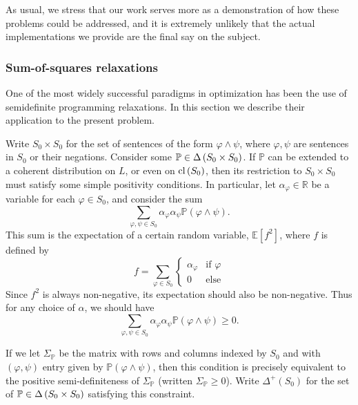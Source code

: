 \documentclass[12pt]{article}
\theoremstyle{definition}
\newcommand{\RR}{\mathbb{R}}
\newcommand{\of}[1]{\left(#1\right)}
\newcommand{\PP}{\mathbb{P}}
\renewcommand{\P}[1]{\mathbb{P}\of{#1}}
\newcommand{\E}[1]{\mathbb{E}\left[#1\right]}
\newcommand{\vp}{\varphi}
\begin{document}
As usual, we stress that our work serves more as a demonstration
of how these problems could be addressed,
and it is extremely unlikely that the actual implementations we provide
are the final say on the subject.

\subsubsection{Sum-of-squares relaxations}\label{sos}

One of the most widely successful paradigms in optimization
has been the use of semidefinite programming relaxations.
In this section we describe their application to the present problem.

Write $S_0 \times S_0$ for the set of sentences of the form $\vp \wedge \psi$,
where $\vp, \psi$ are sentences in $S_0$ or their negations.
Consider some $\PP \in \D{S_0 \times S_0}$.
If $\PP$ can be extended to a coherent distribution on $L$,
or even on $\clS$, then its restriction to $S_0 \times S_0$
must satisfy some simple positivity conditions.
In particular, let $\alpha_{\vp} \in \RR$ be a variable
for each $\vp \in S_0$,
and consider the sum
\[ \sum_{\vp, \psi \in S_0} \alpha_{\vp} \alpha_{\psi} \P{\vp \wedge \psi}. \]
This sum is the expectation of a certain random variable, $\E{f^2}$,
where $f$ is defined by
\[ f = \sum_{\vp \in S_0}  \begin{cases} 
    \alpha_{\vp} & \mbox{if } \vp \\
    0 & \mbox{else}
\end{cases} \]
Since $f^2$ is always non-negative, its expectation should also be non-negative. 
Thus for any choice of $\alpha$, we should have
\[ \sum_{\vp, \psi \in S_0} \alpha_{\vp} \alpha_{\psi} \P{\vp \wedge \psi} \geq 0. \]

\newcommand{\Dp}[1]{\Delta^+\of{#1}}
If we let $\Sigma_{\PP}$ be the matrix with rows and columns indexed by $S_0$
and with $(\vp, \psi)$ entry given by $\P{\vp \wedge \psi}$,
then this condition is precisely equivalent to the positive semi-definiteness
of $\Sigma_{\PP}$ (written $\Sigma_{\PP} \geq 0$).
Write $\Dp{S_0}$ for the set of $\PP \in \D{S_0 \times S_0}$ satisfying this constraint.
\end{document}
